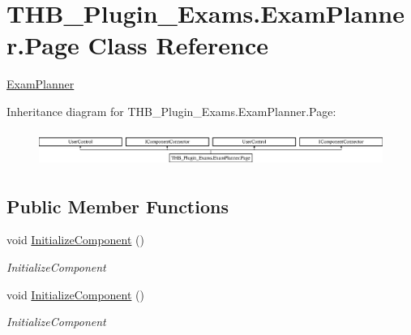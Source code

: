 \hypertarget{class_t_h_b___plugin___exams_1_1_exam_planner_1_1_page}{}\section{T\+H\+B\+\_\+\+Plugin\+\_\+\+Exams.\+Exam\+Planner.\+Page Class Reference}
\label{class_t_h_b___plugin___exams_1_1_exam_planner_1_1_page}


\mbox{\hyperlink{class_t_h_b___plugin___exams_1_1_exam_planner}{Exam\+Planner}}  


Inheritance diagram for T\+H\+B\+\_\+\+Plugin\+\_\+\+Exams.\+Exam\+Planner.\+Page\+:\begin{figure}[H]
\begin{center}
\leavevmode
\includegraphics[height=1.166667cm]{d5/dcf/class_t_h_b___plugin___exams_1_1_exam_planner_1_1_page}
\end{center}
\end{figure}
\subsection*{Public Member Functions}
\begin{DoxyCompactItemize}
\item 
void \mbox{\hyperlink{class_t_h_b___plugin___exams_1_1_exam_planner_1_1_page_a847df3ab7efff49dde2471c64a8ea0b7}{Initialize\+Component}} ()
\begin{DoxyCompactList}\small\item\em Initialize\+Component \end{DoxyCompactList}\item 
void \mbox{\hyperlink{class_t_h_b___plugin___exams_1_1_exam_planner_1_1_page_a847df3ab7efff49dde2471c64a8ea0b7}{Initialize\+Component}} ()
\begin{DoxyCompactList}\small\item\em Initialize\+Component \end{DoxyCompactList}\end{DoxyCompactItemize}
